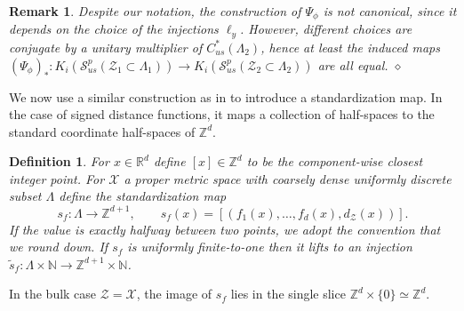 \documentclass[12pt]{amsart}
\newtheorem{definition}[theorem]{Definition}
\newtheorem{remark}[theorem]{Remark}
\newcommand{\NM}{{\mathbb N}}
\newcommand{\RM}{{\mathbb R}}
\newcommand{\ZM}{{\mathbb Z}}
\newcommand{\Ss}{{\mathcal S}}
\newcommand{\Xx}{{\mathcal X}}
\newcommand{\Zz}{{\mathcal Z}}
\begin{document}
\begin{remark}
{\rm Despite our notation, the construction of $\Psi_\phi$ is not canonical, since it depends on the choice of the injections $\ell_y$.
However, different choices are conjugate by a
unitary multiplier of $C^*_{us}(\Lambda_2)$, hence at least the induced maps $(\Psi_\phi)_*:K_i(\Ss^p_{us}(\Zz_1\subset \Lambda_1)) \to K_i(\Ss^p_{us}(\Zz_2\subset \Lambda_2))$ are all equal.} $\diamond$
\end{remark}

We now use a similar construction as in \cite{LudewigThiang25} to introduce a standardization map. In the case of signed distance functions, it maps a collection of
half-spaces to the standard coordinate half-spaces of $\ZM^d$.
\begin{definition}
For $x\in \RM^d$ define $[x]\in \ZM^d$ to be the component-wise closest integer point. For $\Xx$ a proper metric space with coarsely dense uniformly discrete subset $\Lambda$ define the standardization map
$$s_f: \Lambda \to \ZM^{d+1}, \qquad s_f(x)= \left[(f_1(x),\dots,f_d(x), d_{\Zz}(x))\right].$$
If the value is exactly halfway between two points, we adopt the convention that we round down. 
If $s_f$ is uniformly finite-to-one then it lifts to an injection $\tilde{s}_f \colon \Lambda \times \NM \to \ZM^{d+1} \times \NM$.
\end{definition}
In the bulk case $\Zz=\Xx$, the image of $s_f$ lies in the single slice $\ZM^{d}\times \{0\}\simeq \ZM^{d}$.
\end{document}
